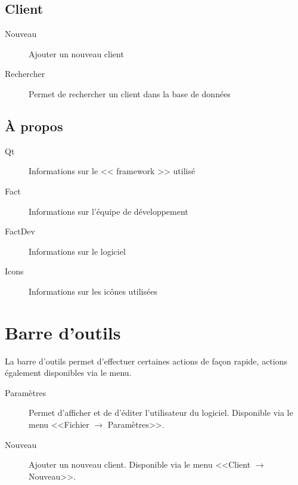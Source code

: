\subsection{Client}
\begin{description}
	\item[Nouveau] Ajouter un nouveau client
	\item[Rechercher] Permet de rechercher un client dans la base de données
\end{description}
\subsection{À propos}
\begin{description}
	\item[Qt] Informations sur le << framework >> utilisé
	\item[Fact] Informations sur l'équipe de développement
	\item[FactDev]Informations sur le logiciel
	\item[Icons] Informations sur les icônes utilisées
\end{description}
\section{Barre d'outils}
La barre d’outils permet d’effectuer certaines actions de façon rapide, actions également disponibles via le menu.

\begin{description}
	\item[Paramètres] Permet d'afficher et de d’éditer l'utilisateur du logiciel. Disponible via le menu <<Fichier $\rightarrow$ Paramètres>>.
	\item[Nouveau] Ajouter un nouveau client. Disponible via le menu <<Client $\rightarrow$ Nouveau>>.
\end{description}

